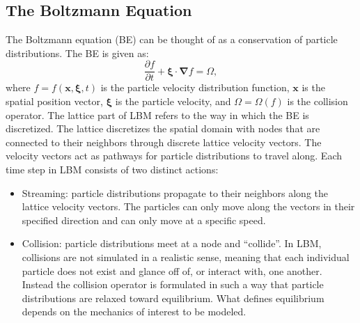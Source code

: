 \documentclass[pdftex,ms]{pittetd}
\newcommand{\pos}{\mathbf{x}}
\newcommand{\pvel}{\boldsymbol{\xi}}
\newcommand{\colop}{\Omega}
\newcommand{\grad}{\boldsymbol{\nabla}}
\begin{document}
\subsection{The Boltzmann Equation}
The Boltzmann equation (BE) can be thought of as a conservation of particle distributions.
The BE is given as:
\begin{equation}
\frac{\partial f}{\partial t} + \pvel \cdot \grad f = \colop,
\end{equation}
\noindent where $f = f(\pos, \pvel, t)$ is the particle velocity distribution function, $\pos$ is the spatial position vector, $\pvel$ is the particle velocity, and $\colop = \colop(f)$ is the collision operator.
The lattice part of LBM refers to the way in which the BE is discretized.
The lattice discretizes the spatial domain with nodes that are connected to their neighbors through discrete lattice velocity vectors.
The velocity vectors act as pathways for particle distributions to travel along.
Each time step in LBM consists of two distinct actions:

\begin{itemize}
\item Streaming: particle distributions propagate to their neighbors along the lattice velocity vectors.
The particles can only move along the vectors in their specified direction and can only move at a specific speed.
\item Collision: particle distributions meet at a node and ``collide''.
In LBM, collisions are not simulated in a realistic sense, meaning that each individual particle does not exist and glance off of, or interact with, one another.
Instead the collision operator is formulated in such a way that particle distributions are relaxed toward equilibrium.
What defines equilibrium depends on the mechanics of interest to be modeled.
\end{itemize}
\end{document}
